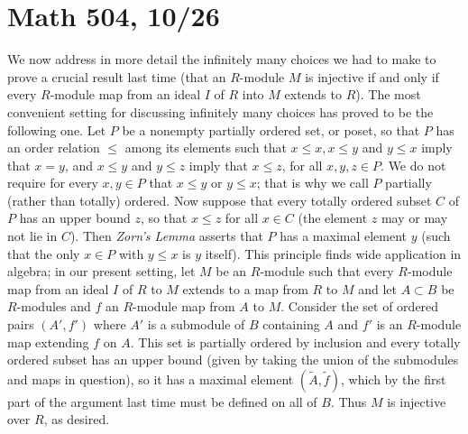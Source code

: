 \documentclass[10pt]{article}
\begin{document}
\section*{Math 504, 10/26}

We now address in more detail the infinitely many choices we had to make
to prove a crucial result last time (that an $R$-module $M$ is injective
if and only if every $R$-module map from an ideal $I$ of $R$ into $M$
extends to $R$). The most convenient setting for discussing infinitely
many choices has proved to be the following one. Let $P$ be a nonempty
partially ordered set, or poset, so that $P$ has an order relation $\le$
among its elements such that $x\le x, x\le y$ and $y\le x$ imply that
$x=y$, and $x\le y$ and $y\le z$ imply that $x\le z$, for all $x,y,z\in
P$. We do not require for every $x,y\in P$ that $x\le y$ or $y\le x$;
that is why we call $P$ partially (rather than totally) ordered. Now
suppose that every totally ordered subset $C$ of $P$ has an upper bound
$z$, so that $x\le z$ for all $x\in C$ (the element $z$ may or may not
lie in $C$). Then {\sl Zorn's Lemma} asserts that $P$ has a maximal
element $y$ (such that the only $x\in P$ with $y\le x$ is $y$ itself).
This principle finds wide application in algebra; in our present
setting, let $M$ be an $R$-module such that every $R$-module map from an
ideal $I$ of $R$ to $M$ extends to a map from $R$ to $M$ and let
$A\subset B$ be $R$-modules and $f$ an $R$-module map from $A$ to $M$.
Consider the set of ordered pairs $(A',f')$ where $A'$ is a submodule of
$B$ containing $A$ and $f'$ is an $R$-module map extending $f$ on $A$.
This set is partially ordered by inclusion and every totally ordered
subset has an upper bound (given by taking the union of the submodules
and maps in question), so it has a maximal element $(\tilde A,\tilde
f)$, which by the first part of the argument last time must be defined
on all of $B$. Thus $M$ is injective over $R$, as desired.
\end{document}
